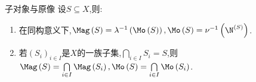 \begin{proposition}{子对象与原像}{}
	设$S\subseteq X$,则:
	\begin{enumerate}
		\item 在同构意义下,$\Mag\left(S\right)=\lambda^{-1}\left(\Mo\left(S\right)\right),\Mo\left(S\right)=\nu^{-1}\left(\N^{\left(S\right)}\right)$.
		\item 若$\left(S_{i}\right)_{i\in I}$是$X$的一族子集,$\bigcap\limits_{i\in I}S_{i}=S$,则$\Mag\left(S\right)=\bigcap\limits_{i\in I}\Mag\left(S_{i}\right),\Mo\left(S\right)=\bigcap\limits_{i\in I}\Mo\left(S_{i}\right)$.
	\end{enumerate}	
\end{proposition}










